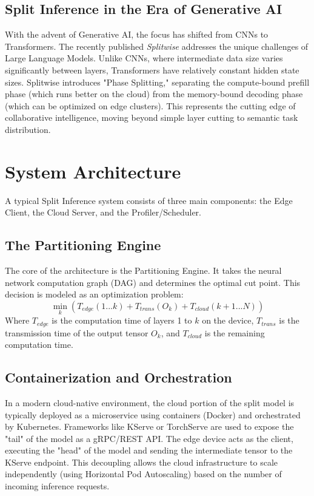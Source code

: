 \documentclass[runningheads]{llncs}
\begin{document}
\subsection{Split Inference in the Era of Generative AI}
With the advent of Generative AI, the focus has shifted from CNNs to Transformers. The recently published \emph{Splitwise} \cite{patel2024splitwise} addresses the unique challenges of Large Language Models. Unlike CNNs, where intermediate data size varies significantly between layers, Transformers have relatively constant hidden state sizes. Splitwise introduces "Phase Splitting," separating the compute-bound prefill phase (which runs better on the cloud) from the memory-bound decoding phase (which can be optimized on edge clusters). This represents the cutting edge of collaborative intelligence, moving beyond simple layer cutting to semantic task distribution.

\section{System Architecture}
A typical Split Inference system consists of three main components: the Edge Client, the Cloud Server, and the Profiler/Scheduler.

\subsection{The Partitioning Engine}
The core of the architecture is the Partitioning Engine. It takes the neural network computation graph (DAG) and determines the optimal cut point. This decision is modeled as an optimization problem:
\begin{equation}
\min_{k} (T_{edge}(1...k) + T_{trans}(O_k) + T_{cloud}(k+1...N))
\end{equation}
Where $T_{edge}$ is the computation time of layers 1 to $k$ on the device, $T_{trans}$ is the transmission time of the output tensor $O_k$, and $T_{cloud}$ is the remaining computation time.

\subsection{Containerization and Orchestration}
In a modern cloud-native environment, the cloud portion of the split model is typically deployed as a microservice using containers (Docker) and orchestrated by Kubernetes. Frameworks like KServe or TorchServe are used to expose the "tail" of the model as a gRPC/REST API. The edge device acts as the client, executing the "head" of the model and sending the intermediate tensor to the KServe endpoint. This decoupling allows the cloud infrastructure to scale independently (using Horizontal Pod Autoscaling) based on the number of incoming inference requests.
\end{document}
